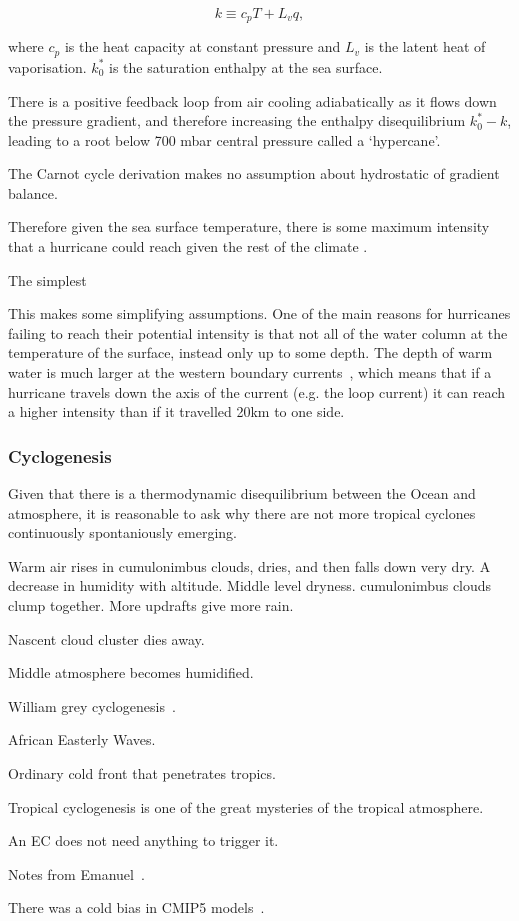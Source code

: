 \begin{equation}
k \equiv c_{p} T+L_{v} q,
\label{eq:enthalpy_per_unit_mass}
\end{equation}

where $c_p$ is the heat capacity at constant pressure and $L_{v}$ is the latent heat
of vaporisation. $k_{0}^{*}$ is the saturation enthalpy at the sea surface.


There is a positive feedback loop from air cooling adiabatically as it flows down
the pressure gradient, and therefore increasing the enthalpy disequilibrium
$k_{0}^{*}-k$, leading to a root below 700 mbar central pressure called a `hypercane'.

The Carnot cycle derivation makes no assumption about hydrostatic of gradient
balance.

Therefore given the sea surface temperature, there is some maximum intensity
that a hurricane could reach given the rest of the climate \cite{bister2002low}.

The simplest

\cite{bister1996development,bister1998dissipative, bister2002low}

This makes some simplifying assumptions. One of the main reasons for
hurricanes failing to reach their potential intensity is that not all of the
water column at the temperature
of the surface, instead only up to some depth. The depth of warm water
is much larger at the western boundary currents~\cite{hogg1995western}, which means that if a hurricane
travels down the axis of the current (e.g. the loop current)
it can reach a higher intensity than
if it travelled 20km to one side.





\subsubsection{Cyclogenesis}


Given that there is a thermodynamic disequilibrium between the Ocean and
atmosphere, it is reasonable to ask why there are not more tropical cyclones
continuously spontaniously emerging.

Warm air rises in cumulonimbus clouds,
 dries, and then falls down very dry.
A decrease in humidity with altitude.
 Middle level dryness.
cumulonimbus clouds clump together.
 More updrafts give more rain.

Nascent cloud cluster dies away.


Middle atmosphere becomes humidified.

William grey cyclogenesis~\cite{gray1975tropical}.

African Easterly Waves.

Ordinary cold front that penetrates tropics.

Tropical cyclogenesis is one of the
 great mysteries of the tropical atmosphere.

An EC does not need anything to trigger it.

Notes from Emanuel~\cite{emanuel2005divine}.

There was a cold bias in CMIP5 models~\cite{camargo2013global}.



